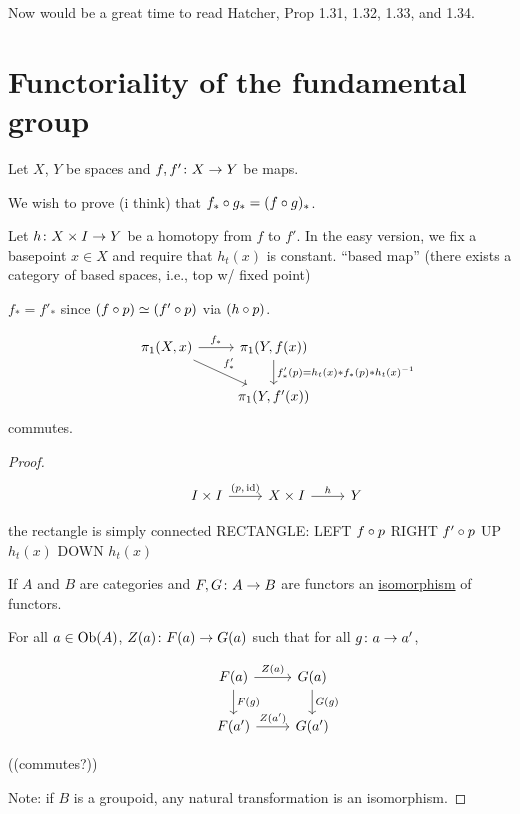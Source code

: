 \documentclass[11pt,leqno,oneside]{amsart}
\newenvironment{dateenv}{
  \vspace{1em}
}{
  \vspace{1em}
}
\newcommand{\mydate}[4]{
  \newdate{#1}{#2}{#3}{#4}
  \begin{dateenv}
    \hfill\displaydate{#1}
  \end{dateenv}
}
\numberwithin{thm}{section}
\newcommand{\homotopic}{\simeq}
\newcommand{\fund}[1][1]{\pi_{#1}}
\newcommand{\x}{\times}
\newcommand{\id}{\operatorname{id}}
\begin{document}
\begin{rmk}
  Now would be a great time to read Hatcher, Prop 1.31, 1.32, 1.33, and 1.34.
\end{rmk}

\mydate{d4}{30}{1}{2017}

\section{Functoriality of the fundamental group}

Let $X$, $Y$ be spaces and $f,f' \colon X \to Y$ be maps.

We wish to prove (i think) that $f_* \circ g_* = (f \circ g)_*$.

Let $h\from X \x I \to Y$ be a homotopy from $f$ to $f'$.  In the easy version, we fix a basepoint $x \in X$ and require that $h_t(x)$ is constant. ``based map'' (there exists a category of based spaces, i.e., top w/ fixed point)

$f_* = f'_*$ since $(f \of p) \homotopic (f' \of p)$ via $(h \circ p)$.


\begin{thm}
  $$\begin{tikzcd}
    &\fund(X,x) \arrow[r, "f_*"] \arrow[rd, "f'_*"] &\fund(Y,f(x)) \arrow[d, "f_*'(p) = h_t(x) * f_*(p) * h_t(x)^{-1}"] \\
    & &\fund(Y, f'(x))
  \end{tikzcd}$$ commutes.
\end{thm}
\begin{proof}
  $$\begin{tikzcd}
    &I \x I \arrow[r, "(p{,}\id)"] &X \x I \arrow[r, "h"] &Y
  \end{tikzcd}$$

  the rectangle is simply connected RECTANGLE: LEFT $f \circ p$ RIGHT
  $f' \circ p$ UP $h_t(x)$ DOWN $h_t(x)$

  If $A$ and $B$ are categories and $F,G\colon A \to B$ are functors an \underline{isomorphism} of functors.

  For all $a \in \operatorname{Ob}(A)$, $Z(a)\colon F(a) \to G(a)$ such that for all $g \colon a \to a'$,

  $$\begin{tikzcd}
    &F(a) \arrow[r, "Z(a)"] \arrow[d, "F(g)"] & G(a) \arrow[d, "G(g)"] \\
    &F(a') \arrow[r, "Z(a')"]                  & G(a')
  \end{tikzcd}$$

  ((commutes?))

  Note: if $B$ is a groupoid, any natural transformation is an isomorphism.
\end{proof}
\end{document}

